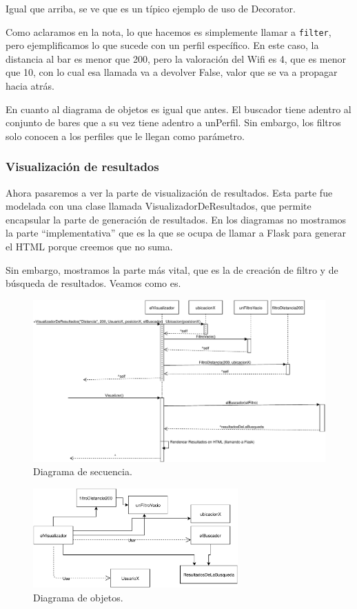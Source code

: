 Igual que arriba, se ve que es un típico ejemplo de uso de Decorator.

Como aclaramos en la nota, lo que hacemos es simplemente llamar a \texttt{filter}, pero ejemplificamos lo que sucede con un perfil específico. En este caso, la distancia al bar es menor que 200, pero la valoración del Wifi es 4, que es menor que 10, con lo cual esa llamada va a devolver False, valor que se va a propagar hacia atrás.

En cuanto al diagrama de objetos es igual que antes. El buscador tiene adentro al conjunto de bares que a su vez tiene adentro a unPerfil. Sin embargo, los filtros solo conocen a los perfiles que le llegan como parámetro.

\subsubsection{Visualización de resultados}

Ahora pasaremos a ver la parte de visualización de resultados. Esta parte fue modelada con una clase llamada VisualizadorDeResultados, que permite encapsular la parte de generación de resultados. En los diagramas no mostramos la parte ``implementativa'' que es la que se ocupa de llamar a Flask para generar el HTML porque creemos que no suma.

Sin embargo, mostramos la parte más vital, que es la de creación de filtro y de búsqueda de resultados. Veamos como es.

\begin{figure}[H]
  \centering
  \includegraphics[width=\textwidth]{diagramas/secuencia_4.pdf}
  \caption{\normalfont Diagrama de secuencia.}
\end{figure}

\begin{figure}[H]
  \centering
  \includegraphics[width=0.7\textwidth]{diagramas/objetos_4.pdf}
  \caption{\normalfont Diagrama de objetos.}
\end{figure}

